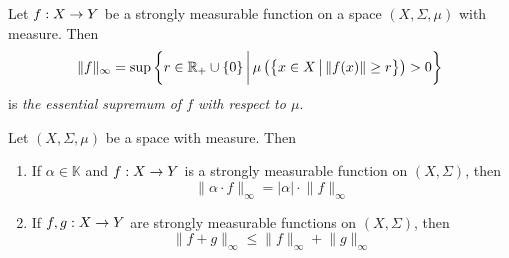 \begin{definition}
    Let $f:X\rightarrow Y$ be a strongly measurable function on a space $(X,\Sigma,\mu)$ with measure. Then
    $$\lVert f \rVert_{\infty} = \sup \bigg\{r\in {\mathbb R}_+\cup \{0\}\,\bigg|\,\mu\left(\big\{x\in X\,\big|\,\lVert f(x)\rVert \geq r\big\}\right) > 0\bigg\}$$
    is \textit{the essential supremum of $f$ with respect to $\mu$}.
\end{definition}

\begin{proposition}\label{proposition:L_infinity_norm_is_seminorm}
    Let $(X,\Sigma,\mu)$ be a space with measure. Then
    \begin{enumerate}[label=\emph{\textbf{(\arabic*)}}, leftmargin=*]
        \item If $\alpha \in \mathbb{K}$ and $f:X\rightarrow Y$ is a strongly measurable function on $(X,\Sigma)$, then
              $$\lVert \alpha \cdot f\rVert_{\infty} = |\alpha|\cdot \lVert f\rVert_{\infty}$$
        \item If $f,g:X\rightarrow Y$ are strongly measurable functions on $(X,\Sigma)$, then
              $$\lVert f + g \rVert_{\infty} \leq \lVert f \rVert_{\infty} + \lVert g \rVert_{\infty}$$
    \end{enumerate}
\end{proposition}
